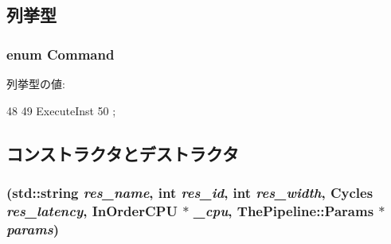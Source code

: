 \subsection{列挙型}
\hypertarget{classExecutionUnit_a2afce0a47a93eee73a314d53e4890153}{
\subsubsection[{Command}]{\setlength{\rightskip}{0pt plus 5cm}enum {\bf Command}}}
\label{classExecutionUnit_a2afce0a47a93eee73a314d53e4890153}
\begin{Desc}
\item[列挙型の値: ]\par
\begin{description}
\item[{\em 
\hypertarget{classExecutionUnit_a2afce0a47a93eee73a314d53e4890153a50945a7008a230660c285c62a9708066}{
ExecuteInst}
\label{classExecutionUnit_a2afce0a47a93eee73a314d53e4890153a50945a7008a230660c285c62a9708066}
}]\end{description}
\end{Desc}




\begin{DoxyCode}
48                  {
49         ExecuteInst
50     };
\end{DoxyCode}


\subsection{コンストラクタとデストラクタ}
\hypertarget{classExecutionUnit_a05c170b2ead38efc8ad22aaa5a5d53b0}{
\subsubsection[{ExecutionUnit}]{ (std::string {\em res\_\-name}, \/  int {\em res\_\-id}, \/  int {\em res\_\-width}, \/  {\bf Cycles} {\em res\_\-latency}, \/  {\bf InOrderCPU} $\ast$ {\em \_\-cpu}, \/  {\bf ThePipeline::Params} $\ast$ {\em params})}}
\label{classExecutionUnit_a05c170b2ead38efc8ad22aaa5a5d53b0}


